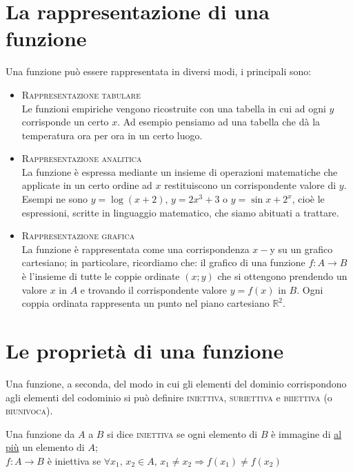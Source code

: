 \newpage

\section{La rappresentazione di una funzione}
Una funzione può essere rappresentata in diversi modi, i principali sono:
\begin{itemize}
  \item \textsc{Rappresentazione tabulare}\\
Le funzioni empiriche vengono ricostruite con una tabella in cui ad ogni $y$ 
corrisponde un certo $x$. Ad esempio pensiamo ad una tabella che dà la 
temperatura ora per ora in un certo luogo.
%
  \item \textsc{Rappresentazione analitica}\\
La funzione è espressa mediante un insieme di operazioni matematiche che 
applicate in un certo ordine ad $x$ restituiscono un corrispondente valore di 
$y$. Esempi ne sono $y=\log{(x+2)}$, $y=2x^3+3$ o $y=\sin{x}+2^x$, cioè le 
espressioni, scritte in linguaggio matematico, che siamo abituati a trattare.
%
  \item \textsc{Rappresentazione grafica}\\
La funzione è rappresentata come una corrispondenza $x-$y su un grafico 
cartesiano; in particolare, ricordiamo che: il grafico di una funzione $f 
:A\to B$ è l'insieme di tutte le coppie ordinate $(x;y)$ che si ottengono 
prendendo un valore $x$ in $A$ e trovando il corrispondente valore $y=f(x)$ 
in $B$. Ogni coppia ordinata rappresenta un punto nel piano cartesiano 
$\mathbb{R}^2$.
\end{itemize}

\section{Le proprietà di una funzione}
Una funzione, a seconda, del modo in cui gli elementi del dominio 
corrispondono agli elementi del codominio si può definire \textsc{iniettiva}, 
\textsc{suriettiva} e \textsc{biiettiva} (o \textsc{biunivoca}).\\

\begin{definizione}
Una funzione da $A$ a $B$ si dice \textsc{iniettiva} se ogni elemento di $B$ 
è immagine di \underline{al più} un elemento di $A$;\\


$f : A\to B$ è iniettiva se  $\forall x_1,\,x_2\in A ,\,x_1\neq 
x_2\Rightarrow f(x_1 )\neq f(x_2)$
\end{definizione}

